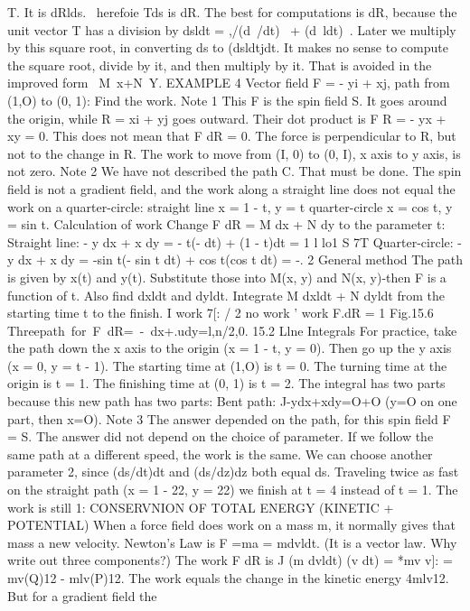 T. It is dRlds. ~herefoie Tds is dR. The best for computations is dR, because the
unit vector T has a division by dsldt = ,/(d~/dt)~ + (d~ldt)~. Later we multiply by this
square root, in converting ds to (dsldtjdt. It makes no sense to compute the square
root, divide by it, and then multiply by it. That is avoided in the improved form
~M~x+N~Y.
EXAMPLE 4 Vector field F = - yi + xj, path from (1,O) to (0, 1): Find the work.
Note 1 This F is the spin field S. It goes around the origin, while R = xi + yj goes
outward. Their dot product is F R = - yx + xy = 0. This does not mean that
F dR = 0. The force is perpendicular to R, but not to the change in R. The work to
move from (I, 0) to (0, I), x axis to y axis, is not zero.
Note 2 We have not described the path C. That must be done. The spin field is not
a gradient field, and the work along a straight line does not equal the work on a
quarter-circle:
straight line x = 1 - t, y = t quarter-circle x = cos t, y = sin t.
Calculation of work Change F dR = M dx + N dy to the parameter t:
Straight line: - y dx + x dy = - t(- dt) + (1 - t)dt = 1 l lo1
S 7T
Quarter-circle: - y dx + x dy = -sin t(- sin t dt) + cos t(cos t dt) = -. 2
General method The path is given by x(t) and y(t). Substitute those into M(x, y)
and N(x, y)-then F is a function of t. Also find dxldt and dyldt. Integrate
M dxldt + N dyldt from the starting time t to the finish.
I work 7[: / 2 no work ' work F.dR = 1
Fig.15.6 Threepath~for~F~dR=~-~dx+.udy=l,n/2,0. 
15.2 Llne Integrals
For practice, take the path down the x axis to the origin (x = 1 - t, y = 0). Then
go up the y axis (x = 0, y = t - 1). The starting time at (1,O) is t = 0. The turning time
at the origin is t = 1. The finishing time at (0, 1) is t = 2. The integral has two parts
because this new path has two parts:
Bent path: J-ydx+xdy=O+O (y=O on one part, then x=O).
Note 3 The answer depended on the path, for this spin field F = S. The answer did
not depend on the choice of parameter. If we follow the same path at a different
speed, the work is the same. We can choose another parameter 2, since (ds/dt)dt and
(ds/dz)dz both equal ds. Traveling twice as fast on the straight path (x = 1 - 22,
y = 22) we finish at t = 4 instead of t = 1. The work is still 1:
CONSERVNION OF TOTAL ENERGY (KINETIC + POTENTIAL)
When a force field does work on a mass m, it normally gives that mass a new velocity.
Newton's Law is F =ma = mdvldt. (It is a vector law. Why write out three components?)
The work F dR is
J (m dvldt) (v dt) = *mv v]: = mv(Q)12 - mlv(P)12.
The work equals the change in the kinetic energy 4mlv12. But for a gradient field the
